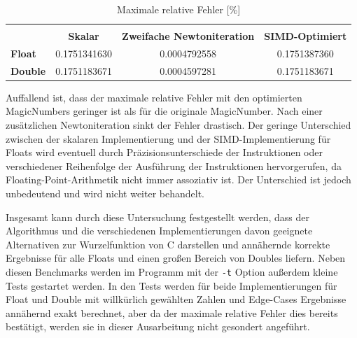 \documentclass[course=erap]{aspdoc}
\begin{document}
\begin{table}[hbt!]
\centering
\begin{tabular}{lccc}
                            & \multicolumn{3}{c}{}                                                                    \\ \cline{2-4} 
\multicolumn{1}{l|}{}       & \multicolumn{1}{c|}{\textbf{Skalar}}     & \multicolumn{1}{c|}{\textbf{Zweifache Newtoniteration}} & \multicolumn{1}{c|}{\textbf{SIMD-Optimiert}} \\ \cline{2-4} 
\multicolumn{1}{l|}{\textbf{Float}}  & \multicolumn{1}{c|}{0.1751341630} & \multicolumn{1}{c|}{0.0004792558}              & \multicolumn{1}{c|}{0.1751387360}   \\ \cline{2-4} 
\multicolumn{1}{l|}{\textbf{Double}} & \multicolumn{1}{c|}{0.1751183671} & \multicolumn{1}{c|}{0.0004597281}              & \multicolumn{1}{c|}{0.1751183671}   \\ \cline{2-4} 
\end{tabular}
\caption{Maximale relative Fehler [{\%}]}
\label{tab:captionError}
\end{table}
Auffallend ist, dass der maximale relative Fehler mit den optimierten MagicNumbers geringer ist als für die originale MagicNumber. Nach einer zusätzlichen Newtoniteration sinkt der Fehler drastisch. Der geringe Unterschied zwischen der skalaren Implementierung und der SIMD-Implementierung für Floats wird eventuell durch Präzisionsunterschiede der Instruktionen oder verschiedener Reihenfolge der Ausführung der Instruktionen hervorgerufen, da Floating-Point-Arithmetik nicht immer assoziativ ist. Der Unterschied ist jedoch unbedeutend und wird nicht weiter behandelt. \par
Insgesamt kann durch diese Untersuchung festgestellt werden, dass der Algorithmus und die verschiedenen Implementierungen davon geeignete Alternativen zur Wurzelfunktion von C darstellen und annähernde korrekte Ergebnisse für alle Floats und einen großen Bereich von Doubles liefern. Neben diesen Benchmarks werden im Programm mit der \lstinline{-t} Option außerdem kleine Tests gestartet werden. In den Tests werden für beide Implementierungen für Float und Double mit willkürlich gewählten Zahlen und Edge-Cases Ergebnisse annähernd exakt berechnet, aber da der maximale relative Fehler dies bereits bestätigt, werden sie in dieser Ausarbeitung nicht gesondert angeführt.

\end{document}
